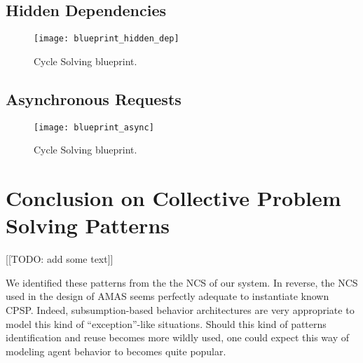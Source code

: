 \subsection{Hidden Dependencies}

\begin{figure}
\centering
\texttt{[image: blueprint\_hidden\_dep]}
\caption{Cycle Solving blueprint.}\label{blueprint_hidden_dep}
\end{figure}

\subsection{Asynchronous Requests}

\begin{figure}
\centering
\texttt{[image: blueprint\_async]}
\caption{Cycle Solving blueprint.}\label{blueprint_async}
\end{figure}

\section{Conclusion on Collective Problem Solving Patterns}

[[TODO: add some text]]

We identified these patterns from the the NCS of our system. In reverse, the NCS used in the design of AMAS seems perfectly adequate to instantiate known CPSP. Indeed, subsumption-based behavior architectures are very appropriate to model this kind of \enquote{exception}-like situations. Should this kind of patterns identification and reuse becomes more wildly used, one could expect this way of modeling agent behavior to becomes quite popular.